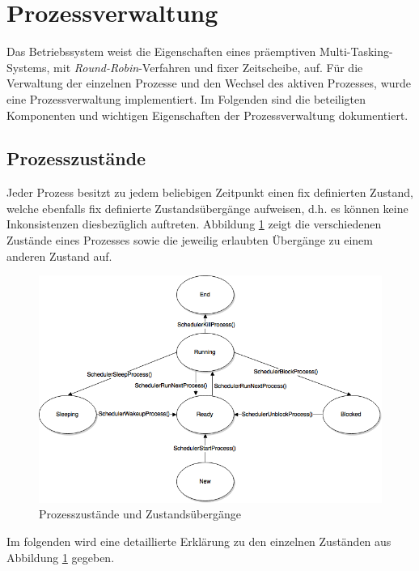 \section{Prozessverwaltung}
\label{chapProcess}
Das Betriebssystem weist die Eigenschaften eines präemptiven Multi-Tasking-Systems, mit \textit{Round-Robin}-Verfahren und fixer Zeitscheibe, auf. Für die Verwaltung der einzelnen Prozesse und den Wechsel des aktiven Prozesses, wurde eine Prozessverwaltung implementiert. Im Folgenden sind die beteiligten Komponenten und wichtigen Eigenschaften der Prozessverwaltung dokumentiert.

\subsection{Prozesszustände}
Jeder Prozess besitzt zu jedem beliebigen Zeitpunkt einen fix definierten Zustand, welche ebenfalls fix definierte Zustandsübergänge aufweisen, d.h. es können keine Inkonsistenzen diesbezüglich auftreten. Abbildung \ref{fig:Process-states} zeigt die verschiedenen Zustände eines Prozesses sowie die jeweilig erlaubten Übergänge zu einem anderen Zustand auf.

\begin{figure}[H]
	\includegraphics[scale=0.60]{chapters/processmanagement/figures/StateTransition}
	\caption{Prozesszustände und Zustandsübergänge}
	\label{fig:Process-states}
\end{figure}

Im folgenden wird eine detaillierte Erklärung zu den einzelnen Zuständen aus Abbildung \ref{fig:Process-states} gegeben.

